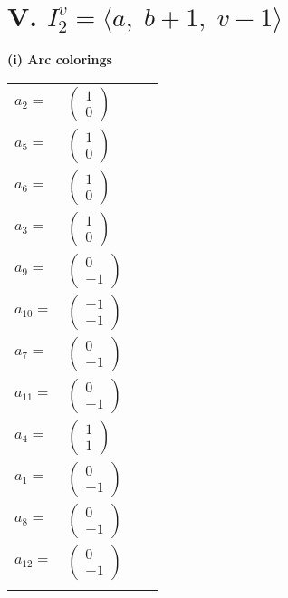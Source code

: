 \documentclass[1p]{elsarticle_modified}
\theoremstyle{definition}
\begin{document}
\centering \section*{V. $I^v_{2}= \langle a,\;b+1,\;v-1 \rangle$}
\flushleft \textbf{(i) Arc colorings}\\
\begin{tabular}{m{7pt} m{180pt} m{7pt} m{180pt} }
\flushright $a_{2}=$&$\begin{pmatrix}1\\0\end{pmatrix}$ \\
\flushright $a_{5}=$&$\begin{pmatrix}1\\0\end{pmatrix}$ \\
\flushright $a_{6}=$&$\begin{pmatrix}1\\0\end{pmatrix}$ \\
\flushright $a_{3}=$&$\begin{pmatrix}1\\0\end{pmatrix}$ \\
\flushright $a_{9}=$&$\begin{pmatrix}0\\-1\end{pmatrix}$ \\
\flushright $a_{10}=$&$\begin{pmatrix}-1\\-1\end{pmatrix}$ \\
\flushright $a_{7}=$&$\begin{pmatrix}0\\-1\end{pmatrix}$ \\
\flushright $a_{11}=$&$\begin{pmatrix}0\\-1\end{pmatrix}$ \\
\flushright $a_{4}=$&$\begin{pmatrix}1\\1\end{pmatrix}$ \\
\flushright $a_{1}=$&$\begin{pmatrix}0\\-1\end{pmatrix}$ \\
\flushright $a_{8}=$&$\begin{pmatrix}0\\-1\end{pmatrix}$ \\
\flushright $a_{12}=$&$\begin{pmatrix}0\\-1\end{pmatrix}$\\&\end{tabular}
\end{document}
